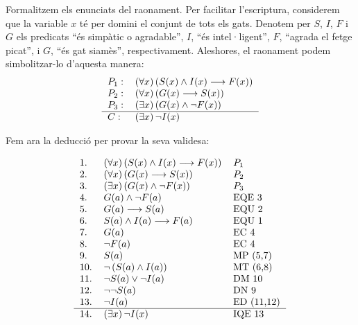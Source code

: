 Formalitzem els enunciats del raonament. Per facilitar l'escriptura,
considerem que la variable $x$ té per domini el conjunt de tots els
gats. Denotem per $S$, $I$, $F$ i $G$ els predicats \enquote{és simpàtic o
agradable}, $I$, \enquote{és intel·ligent}, $F$, \enquote{agrada el
fetge picat}, i $G$, \enquote{és gat siamès}, respectivament. Aleshores, el
raonament podem simbolitzar-lo d'aquesta manera:\begin{equation*}
\begin{tabular}{ll}
$P_{1}:$ & $\left( \forall x\right) \left( S(x)\wedge I(x)\longrightarrow
F(x)\right) $ \\
$P_{2}:$ & $\left( \forall x\right) \left( G(x)\longrightarrow S(x)\right) $
\\
$P_{3}:$ & $\left( \exists x\right) \left( G(x)\wedge\lnot F(x)\right) $ \\
\hline
$C:$ & $\left( \exists x\right) \lnot I(x)$\end{tabular}
\end{equation*}

Fem ara la deducció per provar la seva validesa:

\begin{equation*}
\begin{tabular}{lll}
1. & $\left( \forall x\right) \left( S(x)\wedge I(x)\longrightarrow
F(x)\right) $ & $P_{1}$ \\
2. & $\left( \forall x\right) \left( G(x)\longrightarrow S(x)\right) $ & $P_{2}$ \\
3. & $\left( \exists x\right) \left( G(x)\wedge\lnot F(x)\right) $ & $P_{3}$
\\
4. & $G(a)\wedge\lnot F(a)$ & EQE 3 \\
5. & $G(a)\longrightarrow S(a)$ & EQU 2 \\
6. & $S(a)\wedge I(a)\longrightarrow F(a)$ & EQU 1 \\
7. & $G(a)$ & EC 4 \\
8. & $\lnot F(a)$ & EC 4 \\
9. & $S(a)$ & MP (5,7) \\
10. & $\lnot\left( S(a)\wedge I(a)\right) $ & MT (6,8) \\
11. & $\lnot S(a)\vee\lnot I(a)$ & DM 10 \\
12. & $\lnot\lnot S(a)$ & DN 9 \\
13. & $\lnot I(a)$ & ED (11,12) \\ \hline
14. & $\left( \exists x\right) \lnot I(x)$ & IQE 13\end{tabular}
\end{equation*}

